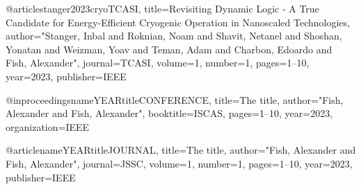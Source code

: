 @article{stanger2023cryoTCASI,
  title={{Revisiting Dynamic Logic - A True Candidate for Energy-Efficient Cryogenic Operation in Nanoscaled Technologies}},
  author="Stanger, Inbal and Roknian, Noam and Shavit, Netanel and Shoshan, Yonatan and Weizman, Yoav and Teman, Adam and Charbon, Edoardo and Fish, Alexander",
  journal=TCASI,
  volume={1},
  number={1},
  pages={1--10},
  year={2023},
  publisher={IEEE}
}


@inproceedings{nameYEARtitleCONFERENCE,
  title={The title},
  author="Fish, Alexander and Fish, Alexander",
  booktitle=ISCAS,
  pages={1--10},
  year={2023},
  organization={IEEE}
}

@article{nameYEARtitleJOURNAL,
  title={The title},
  author="Fish, Alexander and Fish, Alexander",
  journal=JSSC,
  volume={1},
  number={1},
  pages={1--10},
  year={2023},
  publisher={IEEE}
}
